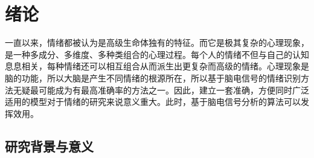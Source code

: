 
\chapter{绪论}
\label{chap:intro}
	一直以来，情绪都被认为是高级生命体独有的特征。而它是极其复杂的心理现象，是一种多成分、多维度、多种类组合的心理过程。每个人的情绪不但与自己的认知息息相关，每种情绪还可以相互组合从而派生出更复杂而高级的情绪。心理现象是脑的功能，所以大脑是产生不同情绪的根源所在，所以基于脑电信号的情绪识别方法无疑最可能成为有最高准确率的方法之一。因此，建立一套准确，方便同时广泛适用的模型对于情绪的研究来说意义重大。此时，基于脑电信号分析的算法可以发挥效用。


\section{研究背景与意义}

